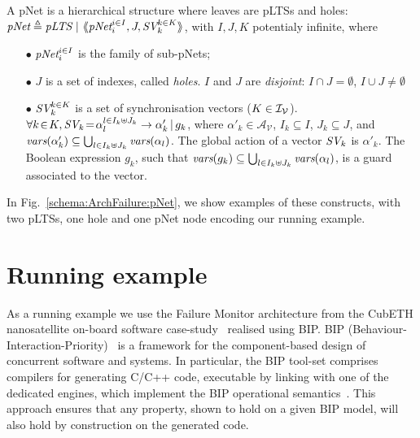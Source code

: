 \documentclass{lncs/llncs}
\newcommand{\cA}{\ensuremath{\mathcal{A}}}
\newcommand{\cV}{\ensuremath{\mathcal{V}}}
\newcommand{\variables}{\ensuremath{\cV}}
\newcommand{\actions}[1]{\ensuremath{\cA_{#1}}}
\def\AlgAS{\mathcal{A}_S}
\begin{document}
  \begin{definition}[pNets]\label{def-pnets}
    A pNet is a hierarchical structure where leaves are pLTSs and holes:
$\pNet\triangleq \pLTS~|~\mylangle \pNet_i^{i\in I}, J, \symb{SV}_k^{k\in 
K}\myrangle$, with $I, J, K$ potentialy infinite,
where
\begin{itemize}
\item[$\bullet$] $\pNet_i^{i\in I}$ is the family of sub-pNets;

\item[$\bullet$] $J$ is a set of indexes, called \emph{holes}.
$I$ and $J$ are \emph{disjoint}: $I\!\cap\! J=\emptyset$,  $I\!\cup\! J\neq\emptyset$

\item[$\bullet$] $\symb{SV}_k^{k\in K}$ is a set of
  synchronisation vectors ($K\in\mathcal{I}_\mathcal V$). $\forall k\!\in\! K,
  \symb{SV}_k\!=\!\alpha_{l}^{l\in I_k \uplus J_k}\to\alpha'_k\,|\,g_k$, where
  $\alpha'_k\in \actions{\variables}$, $I_k\subseteq I$, $J_k\subseteq J$, and 
  $\vars(\alpha'_k)\subseteq \bigcup_{l\in I_k\uplus 
  J_k}{\vars({\alpha_l})}$. The global action of a vector $\symb{SV}_k$ is
$\alpha'_k$. The Boolean expression $g_k $, such that $\vars(g_k)\subseteq \bigcup_{l\in 
I_k\uplus J_k}{\vars({\alpha_l})}$, is a guard associated to the vector.

\end{itemize}
\end{definition}

In Fig.~\ref{schema:ArchFailure:pNet}, we show examples of these
constructs, with two pLTSs, one hole and one pNet node encoding our running example.



\section{Running example}
\label{section:FailureTimerMax}
\label{section:BIParchitectures}
\label{section:examples}

As a running example we use the Failure Monitor architecture from the
CubETH nanosatellite on-board software
case-study~\cite{CubETH-case-study} realised using BIP.  BIP
(Behaviour-Interaction-Priority)~\cite{bip} is a framework for the
component-based design of concurrent software and systems.  In
particular, the BIP tool-set comprises compilers for generating C/C++
code, executable by linking with one of the dedicated engines, which
implement the BIP operational semantics~\cite{BarBliu15-offer-scico}.  This
approach ensures that any property, shown to hold on a given BIP
model, will also hold by construction on the generated code.
\end{document}
